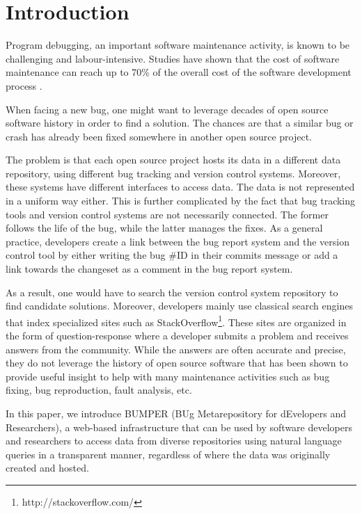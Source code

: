 \documentclass[conference]{IEEEtran}
\begin{document}
\section{Introduction}

Program debugging, an important software maintenance activity, is known to be challenging and labour-intensive. Studies have shown that the cost of software maintenance can reach up to 70\% of the overall cost of the software development process \cite{Pressman2005}.

When facing a new bug, one might want to leverage decades of open source software history in order to find a solution. The chances are that a similar bug or crash has already been fixed somewhere in another open source project.

The problem is that each open source project hosts its data in a different data repository, using different bug tracking and version control systems. Moreover, these systems have different interfaces to access data.
The data is not represented in a uniform way either. This is further complicated by the fact that bug tracking tools and version control systems are not necessarily connected. The former follows the life of the bug, while the latter manages the fixes.
As a general practice, developers create a link between the bug report system and the version control tool by either writing the bug \#ID in their commits message or add a link towards the changeset as a comment in the bug report system.

As a result, one would have to search the version control system repository to find candidate solutions.
 Moreover, developers mainly use classical search engines that index specialized sites such as StackOverflow\footnote{http://stackoverflow.com/}. These sites are organized in the form of question-response where a developer submits a problem and receives answers from the community. While the answers are often accurate and precise, they do not leverage the history of open source software that has been shown to provide useful insight to help with many maintenance activities such as bug fixing\cite{Saha2014}, bug reproduction\cite{Nayrolles2015c}, fault analysis\cite{Nessa2008}, etc.

In this paper, we introduce BUMPER (BUg Metarepository for dEvelopers and Researchers), a web-based infrastructure that can be used by software developers and researchers to access data from diverse repositories using natural language queries in a transparent manner, regardless of where the data was originally created and hosted.
\end{document}

